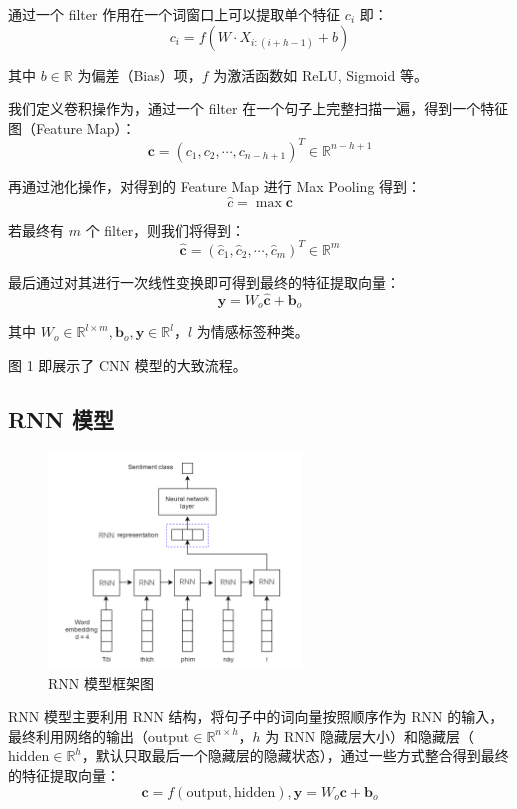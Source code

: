 \documentclass[a4paper]{article}
\begin{document}
    通过一个 filter 作用在一个词窗口上可以提取单个特征 $c_i$ 即：
    $$
    c_i = f(W \cdot X_{i: (i + h - 1)} + b)
    $$
    
    其中 $b \in \mathbb{R}$ 为偏差（Bias）项，$f$ 为激活函数如 ReLU, Sigmoid 等。

    我们定义卷积操作为，通过一个 filter 在一个句子上完整扫描一遍，得到一个特征图（Feature Map）：
    $$
    \mathbf{c} = (c_1, c_2, \cdots, c_{n - h + 1})^T \in \mathbb{R}^{n - h + 1}
    $$

    再通过池化操作，对得到的 Feature Map 进行 Max Pooling 得到：
    $$
    \hat{c} = \max \mathbf{c}
    $$

    若最终有 $m$ 个 filter，则我们将得到：
    $$
    \mathbf{\hat{c}} = (\hat{c}_1, \hat{c}_2, \cdots, \hat{c}_m)^T \in \mathbb{R}^m
    $$

    最后通过对其进行一次线性变换即可得到最终的特征提取向量：
    $$
    \mathbf{y} = W_o \mathbf{\hat{c}} + \mathbf{b}_o
    $$

    其中 $W_o \in \mathbb{R}^{l \times m}, \mathbf{b}_o, \mathbf{y} \in \mathbb{R}^{l}$，$l$ 为情感标签种类。
    
    图 1 即展示了 CNN 模型的大致流程。

    \subsection{RNN 模型}

    \begin{figure}[h]
        \centering
        \includegraphics[width=0.6\textwidth]{2}
        \caption{RNN 模型框架图}
        \label{fig2}
    \end{figure}

    RNN 模型主要利用 RNN 结构，将句子中的词向量按照顺序作为 RNN 的输入，最终利用网络的输出（$\mathrm{output} \in \mathbb{R}^{n \times h}$，$h$ 为 RNN 隐藏层大小）和隐藏层（$\mathrm{hidden} \in \mathbb{R}^{h}$，默认只取最后一个隐藏层的隐藏状态），通过一些方式整合得到最终的特征提取向量：
    $$
    \mathbf{c} = f(\mathrm{output}, \mathrm{hidden}), \mathbf{y} = W_o \mathbf{c} + \mathbf{b}_o
    $$
    
\end{document}
